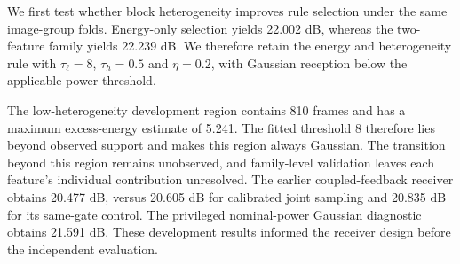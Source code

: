 We first test whether block heterogeneity improves rule selection under the same image-group folds. Energy-only selection yields 22.002 dB, whereas the two-feature family yields 22.239 dB. We therefore retain the energy and heterogeneity rule with $\tau_\ell=8$, $\tau_h=0.5$ and $\eta=0.2$, with Gaussian reception below the applicable power threshold.

The low-heterogeneity development region contains 810 frames and has a maximum excess-energy estimate of 5.241. The fitted threshold 8 therefore lies beyond observed support and makes this region always Gaussian. The transition beyond this region remains unobserved, and family-level validation leaves each feature's individual contribution unresolved. The earlier coupled-feedback receiver obtains 20.477 dB, versus 20.605 dB for calibrated joint sampling and 20.835 dB for its same-gate control. The privileged nominal-power Gaussian diagnostic obtains 21.591 dB. These development results informed the receiver design before the independent evaluation.
